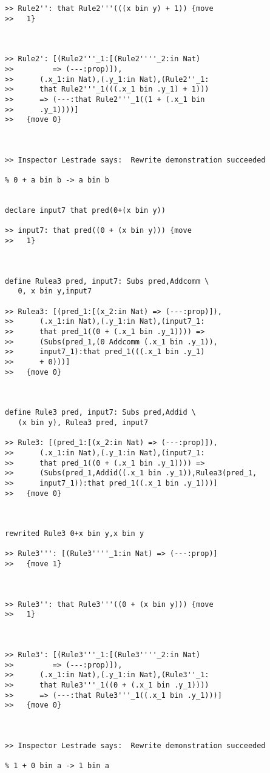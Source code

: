 \documentclass{article}
\begin{document}
\begin{verbatim}
>> Rule2'': that Rule2'''(((x bin y) + 1)) {move
>>   1}



>> Rule2': [(Rule2'''_1:[(Rule2''''_2:in Nat)
>>         => (---:prop)]),
>>      (.x_1:in Nat),(.y_1:in Nat),(Rule2''_1:
>>      that Rule2'''_1(((.x_1 bin .y_1) + 1)))
>>      => (---:that Rule2'''_1((1 + (.x_1 bin
>>      .y_1))))]
>>   {move 0}



>> Inspector Lestrade says:  Rewrite demonstration succeeded

% 0 + a bin b -> a bin b


declare input7 that pred(0+(x bin y))

>> input7: that pred((0 + (x bin y))) {move
>>   1}



define Rulea3 pred, input7: Subs pred,Addcomm \
   0, x bin y,input7

>> Rulea3: [(pred_1:[(x_2:in Nat) => (---:prop)]),
>>      (.x_1:in Nat),(.y_1:in Nat),(input7_1:
>>      that pred_1((0 + (.x_1 bin .y_1)))) =>
>>      (Subs(pred_1,(0 Addcomm (.x_1 bin .y_1)),
>>      input7_1):that pred_1(((.x_1 bin .y_1)
>>      + 0)))]
>>   {move 0}



define Rule3 pred, input7: Subs pred,Addid \
   (x bin y), Rulea3 pred, input7

>> Rule3: [(pred_1:[(x_2:in Nat) => (---:prop)]),
>>      (.x_1:in Nat),(.y_1:in Nat),(input7_1:
>>      that pred_1((0 + (.x_1 bin .y_1)))) =>
>>      (Subs(pred_1,Addid((.x_1 bin .y_1)),Rulea3(pred_1,
>>      input7_1)):that pred_1((.x_1 bin .y_1)))]
>>   {move 0}



rewrited Rule3 0+x bin y,x bin y

>> Rule3''': [(Rule3''''_1:in Nat) => (---:prop)]
>>   {move 1}



>> Rule3'': that Rule3'''((0 + (x bin y))) {move
>>   1}



>> Rule3': [(Rule3'''_1:[(Rule3''''_2:in Nat)
>>         => (---:prop)]),
>>      (.x_1:in Nat),(.y_1:in Nat),(Rule3''_1:
>>      that Rule3'''_1((0 + (.x_1 bin .y_1))))
>>      => (---:that Rule3'''_1((.x_1 bin .y_1)))]
>>   {move 0}



>> Inspector Lestrade says:  Rewrite demonstration succeeded

% 1 + 0 bin a -> 1 bin a



\end{verbatim}
\end{document}
